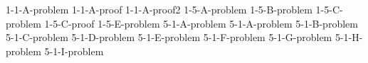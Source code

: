 \documentclass[uplatex, dvipdfmx, a4paper, 12pt, class=jsarticle, crop=false]{standalone}
\begin{document}
	{1-1-A-problem}
	{1-1-A-proof}
	{1-1-A-proof2}
	{1-5-A-problem}
	{1-5-B-problem}
	{1-5-C-problem}
  {1-5-C-proof}
	{1-5-E-problem}
	{5-1-A-problem}
	{5-1-A-problem}
	{5-1-B-problem}
	{5-1-C-problem}
	{5-1-D-problem}
	{5-1-E-problem}
	{5-1-F-problem}
	{5-1-G-problem}
	{5-1-H-problem}
	{5-1-I-problem}
\end{document}
